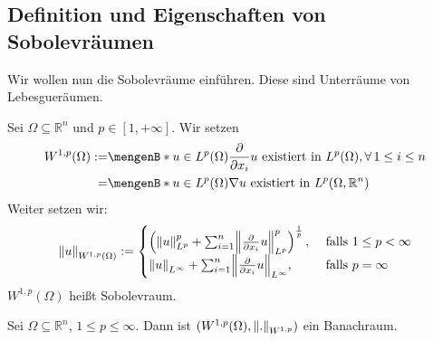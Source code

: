 \subsection{Definition und Eigenschaften von Sobolevräumen} 
\label{sub:definition_und_eigenschaften_von_sobolevraumen}
Wir wollen nun die Sobolevräume einführen. Diese sind Unterräume von Lebesgueräumen.
\begin{definition*}
	Sei $\Omega \subseteq \mathbb{R}^n$ und $ p \in [1, + \infty]$. Wir setzen
	\begin{align*}
		W^{1,p}(\Omega) :=& \set[u \in L^p(\Omega)]{ \diff{}{x_i}u \text{ existiert in }L^p(\Omega), \forall\, 1 \leq i \leq n} \\
		=& \set[u \in L^p(\Omega)]{ \nabla u \text{ existiert in }L^p(\Omega, \mathbb{R}^n)}
	\end{align*}
	Weiter setzen wir:
	\[
		\norm{u}_{W^{1,p}(\Omega)} := \begin{cases}
			\left( \norm{u}_{L^p}^p + \sum^{n}_{i=1}\norm{ \diff{}{x_i}u}_{L^p}^p \right)^{\frac{1}{p}}, &\text{ falls }1 \leq p < \infty\\
			\norm{u}_{L^{\infty}} + \sum^{n}_{i=1}\norm{\diff{}{x_i}u}_{L^{\infty}}, &\text{ falls }p = \infty
		\end{cases}
	\]
	$W^{1,p}(\Omega)$ heißt Sobolevraum.
\end{definition*}
\begin{satz}[Vollständigkeit]
	Sei $\Omega \subseteq \mathbb{R}^n$, $1 \leq p \leq  \infty$. Dann ist $(W^{1,p}(\Omega), \norm{.}_{W^{1,p}})$ ein Banachraum.
\end{satz}
